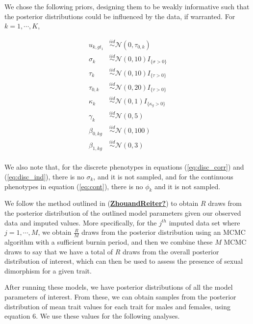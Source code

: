 \documentclass[
  12pt,
]{article}
\begin{document}
We chose the following priors, designing them to be weakly informative
such that the posterior distributions could be influenced by the data,
if warranted. For \(k = 1,\cdots,K\),

\begin{align}
u_{k,gt_1} & \overset{iid}{\sim}\mathcal{N}(0,\tau_{0,k}) \nonumber \\
\sigma_k & \overset{iid}{\sim}\mathcal{N}(0,10)I_{\{\sigma > 0\}} \nonumber \\
\tau_k & \overset{iid}{\sim}\mathcal{N}(0,10)I_{\{\tau > 0\}} \nonumber \\
\tau_{0,k} & \overset{iid}{\sim}\mathcal{N}(0,20)I_{\{\tau > 0\}} \nonumber \\
\kappa_k & \overset{iid}{\sim}\mathcal{N}(0,1)I_{\{\kappa_g > 0\}} \nonumber \\
\gamma_{k} & \overset{iid}{\sim}\mathcal{N}(0,5) \nonumber \\
\beta_{0,kg} & \overset{iid}{\sim}\mathcal{N}(0,100) \nonumber \\
\beta_{1,kg} & \overset{iid}{\sim}\mathcal{N}(0,3) \nonumber \\
\label{eq:priors}
\end{align}

We also note that, for the discrete phenotypes in equations
(\ref{eq:disc_corr}) and (\ref{eq:disc_ind}), there is no \(\sigma_k\),
and it is not sampled, and for the continuous phenotypes in equation
(\ref{eq:cont}), there is no \(\phi_k\) and it is not sampled.

We follow the method outlined in
(\protect\hyperlink{ref-ZhouandReiter}{\textbf{ZhouandReiter?}}) to
obtain \(R\) draws from the posterior distribution of the outlined model
parameters given our observed data and imputed values. More
specifically, for the \(j^{th}\) imputed data set where
\(j = 1,\cdots,M\), we obtain \(\frac{R}{M}\) draws from the posterior
distribution using an MCMC algorithm with a sufficient burnin period,
and then we combine these \(M\) MCMC draws to say that we have a total
of \(R\) draws from the overall posterior distribution of interest,
which can then be used to assess the presence of sexual dimorphism for a
given trait.

After running these models, we have posterior distributions of all the
model parameters of interest. From these, we can obtain samples from the
posterior distribution of mean trait values for each trait for males and
females, using equation 6. We use these values for the following
analyses.
\end{document}
